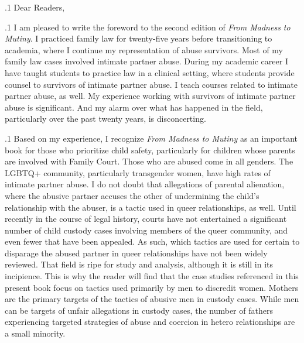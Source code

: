 \documentclass[11pt, twoside]{article}
\begin{document}
\thispagestyle{empty}

{\fontsize{13}{19}\selectfont


\hspace{-5em}\begin{minipage}{1.1\textwidth}
\begin{flushright}
{\fontsize{14}{22}\selectfont
\textbf{%
}
}
\end{flushright}
\end{minipage}


\vspace{6em}



\p.1{%
\noindent{}Dear Readers,
} %

\p.1{%
\noindent{}I am pleased to write the foreword to the second edition of
\textit{From Madness to Mutiny}. I practiced family law for twenty-five years before
transitioning to academia, where I continue my representation of abuse
survivors. Most of my family law cases involved intimate partner abuse.
During my academic career I have taught students to practice law in a
clinical setting, where students provide counsel to survivors of intimate
partner abuse. I teach courses related to intimate partner abuse, as well.
My experience working with survivors of intimate partner abuse is significant. And my alarm over what has happened in the field, particularly
over the past twenty years, is disconcerting.
} %

\p.1{%
Based on my experience, I recognize \textit{From Madness to Mutiny} as an
important book for those who prioritize child safety, particularly for
children whose parents are involved with Family Court. Those who
are abused come in all genders. The LGBTQ+ community, particularly
transgender women, have high rates of intimate partner abuse. I do not
doubt that allegations of parental alienation, where the abusive partner accuses the other of undermining the child's relationship with the
abuser, is a tactic used in queer relationships, as well. Until recently
in the course of legal history, courts have not entertained a significant
number of child custody cases involving members of the queer community, and even fewer that have been appealed. As such, which tactics are
used for certain to disparage the abused partner in queer relationships
have not been widely reviewed. That field is ripe for study and analysis,
although it is still in its incipience. This is why the reader will find that
the case studies referenced in this present book focus on tactics used
primarily by men to discredit women. Mothers are the primary targets
of the tactics of abusive men in custody cases. While men can be targets
of unfair allegations in custody cases, the number of fathers experiencing targeted strategies of abuse and coercion in hetero relationships are
a small minority.
} %

}
\end{document}
